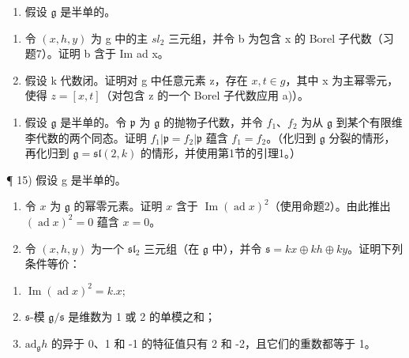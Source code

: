 \begin{enumerate}
\def\labelenumi{\arabic{enumi})}
\setcounter{enumi}{12}
\tightlist
\item
  假设 \(\mathfrak{g}\) 是半单的。
\end{enumerate}

\begin{enumerate}
\def\labelenumi{\alph{enumi})}
\item
  令 \((x, h, y)\) 为 g 中的主 \(sl_{2}\) 三元组，并令 b 为包含 x 的 Borel 子代数（习题7）。证明 b 含于 Im ad x。
\item
  假设 k 代数闭。证明对 g 中任意元素 z，存在 \(x, t \in g\)，其中 x 为主幂零元，使得 \(z = [x, t]\)（对包含 z 的一个 Borel 子代数应用 a)）。
\end{enumerate}

\begin{enumerate}
\def\labelenumi{\arabic{enumi})}
\setcounter{enumi}{13}
\tightlist
\item
  假设 \(\mathfrak{g}\) 是半单的。令 \(\mathfrak{p}\) 为 \(\mathfrak{g}\) 的抛物子代数，并令 \(f_{1}\)、\(f_{2}\) 为从 \(\mathfrak{g}\) 到某个有限维李代数的两个同态。证明 \(f_{1}|\mathfrak{p} = f_{2}|\mathfrak{p}\) 蕴含 \(f_{1} = f_{2}\)。（化归到 \(\mathfrak{g}\) 分裂的情形，再化归到 \(\mathfrak{g} = \mathfrak{sl}(2,k)\) 的情形，并使用第1节的引理1。）
\end{enumerate}

¶ 15) 假设 g 是半单的。

\begin{enumerate}
\def\labelenumi{\alph{enumi})}
\item
  令 \(x\) 为 \(\mathfrak{g}\) 的幂零元素。证明 \(x\) 含于 \(\operatorname{Im}(\operatorname{ad} x)^2\)（使用命题2）。由此推出 \((\operatorname{ad} x)^2 = 0\) 蕴含 \(x = 0\)。
\item
  令 \((x,h,y)\) 为一个 \(\mathfrak{sl}_2\) 三元组（在 \(\mathfrak{g}\) 中），并令 \(\mathfrak{s} = kx\oplus kh\oplus ky\)。证明下列条件等价：
\end{enumerate}

\begin{enumerate}
\def\labelenumi{(\roman{enumi})}
\item
  \(\operatorname{Im}(\operatorname{ad} x)^{2}=k.x;\)
\item
  \(\mathfrak{s}\)-模 \(\mathfrak{g} / \mathfrak{s}\) 是维数为 1 或 2 的单模之和；
\item
  \(\mathrm{ad}_{\mathfrak{g}}h\) 的异于 0、1 和 -1 的特征值只有 2 和 -2，且它们的重数都等于 1。
\end{enumerate}

